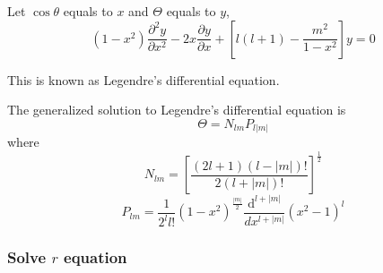 \documentclass[letterpaper]{article}
\newcommand{\pd}[2]{\frac{\partial #1}{\partial #2}}
\newcommand{\pdd}[2]{\frac{\partial^2 #1}{\partial #2^2}}
\newcommand{\diff}{\mathrm{d}}
\begin{document}
Let $\cos\theta$ equals to $x$ and $\Theta$ equals to $y$,
\begin{equation*}
    (1-x^2)\pdd{y}{x}-2x\pd{y}{x}+\left[l(l+1)-\frac{m^2}{1-x^2}\right]y=0
\end{equation*}

This is known as Legendre's differential equation.

The generalized solution to Legendre's differential equation is
\begin{equation*}
    \Theta=N_{lm}P_{l|m|}
\end{equation*}
where
\begin{equation*}
    N_{lm}=\left[\frac{(2l+1)(l-|m|)!}{2(l+|m|)!}\right]^{\frac{1}{2}}
\end{equation*}
\begin{equation*}
    P_{lm}=\frac{1}{2^ll!}(1-x^2)^{\frac{|m|}{2}}\frac{\diff^{l+|m|}}{dx^{l+|m|}}(x^2-1)^l
\end{equation*}
\subsubsection*{Solve $r$ equation}
\end{document}
